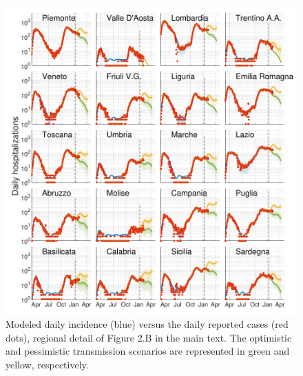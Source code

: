 \begin{figure}
    \centering
    \includegraphics[width=1\textwidth]{fig_italy-ocp/figuresSI/DA_all_sim/incidence.pdf}
    \caption[Modeled daily incidence against the daily reported cases]{Modeled daily incidence (blue) versus the daily reported cases (red dots), regional detail of Figure 2.B in the main text. The optimistic and pessimistic transmission scenarios are represented in green and yellow, respectively.}
    \label{fig:SI_DA2}
\end{figure}

